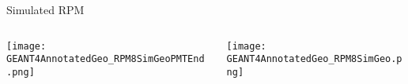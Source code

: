 \begin{frame}{Simulated RPM}
  \begin{columns}[onlytextwidth]
    \begin{column}{0.45\textwidth}
		\texttt{[image: GEANT4AnnotatedGeo\_RPM8SimGeoPMTEnd.png]}
    \end{column}
    \begin{column}{0.45\textwidth}
		\texttt{[image: GEANT4AnnotatedGeo\_RPM8SimGeo.png]}
    \end{column}
  \end{columns}
\end{frame}
